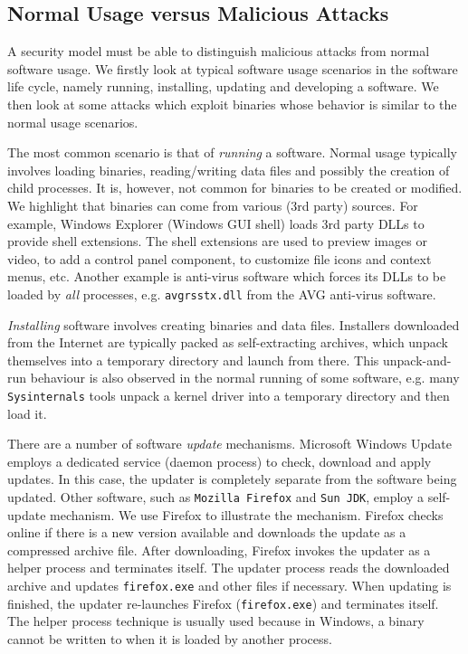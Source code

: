 \subsection{Normal Usage versus Malicious Attacks}
\label{sec:usageattack}

A security model must be able to distinguish
malicious attacks from normal software usage.
We firstly look at typical software usage scenarios in the
software life cycle, namely running, installing, updating and developing 
a software.
We then look at some attacks which exploit binaries whose
behavior is similar to the normal usage scenarios.

The most common scenario is that of {\em running} a software.
Normal usage typically involves loading binaries,
reading/writing data files and possibly the creation of child processes.
It is, however, not common for binaries to be created or modified.
We highlight that binaries can come from
various (3rd party) sources.
For example, Windows Explorer (Windows GUI shell) loads 3rd party DLLs
to provide shell extensions.
The shell extensions are used to preview
images or video, to add a control panel component, to customize
file icons and context menus, etc.
Another example is anti-virus software which forces
its DLLs to be loaded by {\em all} processes, e.g. {\tt avgrsstx.dll}
from the AVG anti-virus software.

{\em Installing} software involves creating binaries
and data files.
Installers downloaded from the Internet are typically packed as
self-extracting archives, which
unpack themselves into a temporary directory and launch from there.
This unpack-and-run behaviour is also observed in the normal
running of some software, e.g.
many {\tt Sysinternals} tools
unpack a kernel driver into a temporary directory and then load it.

There are a number of software {\em update} mechanisms.
Microsoft Windows Update employs a dedicated service (daemon process) to check,
download and apply updates.
In this case, the updater is completely separate from 
the software being updated.
Other software, such as {\tt Mozilla Firefox} and {\tt Sun JDK},
employ a self-update mechanism.
We use Firefox to illustrate the mechanism.
Firefox checks online if there is a new version available and
downloads the update as a compressed archive file.
After downloading, Firefox invokes the updater
as a helper process and terminates itself.
The updater process reads the downloaded archive and 
updates {\tt firefox.exe}
and other files if necessary.
When updating is finished, the updater re-launches Firefox ({\tt firefox.exe})
and terminates itself.
The helper process technique is usually used
because in Windows, a binary cannot be written to when it is loaded by
another process.

